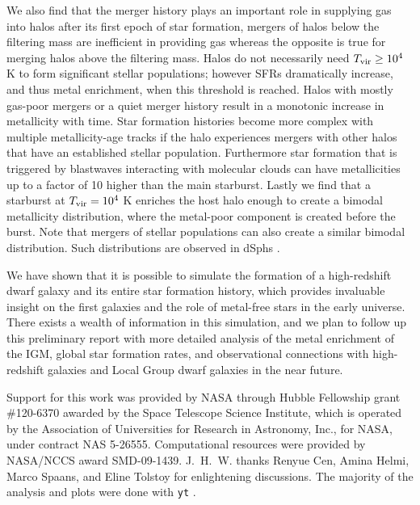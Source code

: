 \documentclass[apjl]{emulateapj}
\begin{document}
We also find that the merger history plays an important role in
supplying gas into halos after its first epoch of star formation,
mergers of halos below the filtering mass are inefficient in providing
gas whereas the opposite is true for merging halos above the filtering
mass.  Halos do not necessarily need $\tvir \ge 10^4$ K to form
significant stellar populations; however SFRs dramatically increase,
and thus metal enrichment, when this threshold is reached.  Halos with
mostly gas-poor mergers or a quiet merger history result in a
monotonic increase in metallicity with time.  Star formation histories
become more complex with multiple metallicity-age tracks if the halo
experiences mergers with other halos that have an established stellar
population.  Furthermore star formation that is triggered by
blastwaves interacting with molecular clouds can have metallicities up
to a factor of 10 higher than the main starburst.  Lastly we find that
a starburst at $\tvir = 10^4$ K enriches the host halo enough to
create a bimodal metallicity distribution, where the metal-poor
component is created before the burst.  Note that mergers of stellar
populations can also create a similar bimodal distribution.  Such
distributions are observed in dSphs \citep[e.g.][]{Battaglia10}.

We have shown that it is possible to simulate the formation of a
high-redshift dwarf galaxy and its entire star formation history,
which provides invaluable insight on the first galaxies and the role
of metal-free stars in the early universe.  There exists a wealth of
information in this simulation, and we plan to follow up this
preliminary report with more detailed analysis of the metal enrichment
of the IGM, global star formation rates, and observational connections
with high-redshift galaxies and Local Group dwarf galaxies in the near
future.

\acknowledgments

Support for this work was provided by NASA through Hubble Fellowship
grant \#120-6370 awarded by the Space Telescope Science Institute,
which is operated by the Association of Universities for Research in
Astronomy, Inc., for NASA, under contract NAS 5-26555.  Computational
resources were provided by NASA/NCCS award SMD-09-1439.
J.~H.~W. thanks Renyue Cen, Amina Helmi, Marco Spaans, and Eline
Tolstoy for enlightening discussions.  The majority of the analysis
and plots were done with \texttt{yt} \citep{yt_full_paper}.

%

\end{document}
